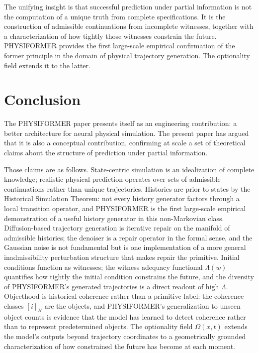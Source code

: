 \documentclass[12pt,oneside]{article}
\theoremstyle{definition}
\begin{document}
The unifying insight is that successful prediction under partial information
is not the computation of a unique truth from complete specifications. It is
the construction of admissible continuations from incomplete witnesses, together
with a characterization of how tightly those witnesses constrain the future.
PHYSIFORMER provides the first large-scale empirical confirmation of the former
principle in the domain of physical trajectory generation. The optionality field
extends it to the latter.

\section*{Conclusion}

The PHYSIFORMER paper presents itself as an engineering contribution: a better
architecture for neural physical simulation. The present paper has argued that
it is also a conceptual contribution, confirming at scale a set of theoretical
claims about the structure of prediction under partial information.

Those claims are as follows. State-centric simulation is an idealization of complete
knowledge; realistic physical prediction operates over sets of admissible continuations
rather than unique trajectories. Histories are prior to states by the Historical
Simulation Theorem: not every history generator factors through a local transition
operator, and PHYSIFORMER is the first large-scale empirical demonstration of a
useful history generator in this non-Markovian class. Diffusion-based trajectory
generation is iterative repair on the manifold of admissible histories; the denoiser
is a repair operator in the formal sense, and the Gaussian noise is not fundamental
but is one implementation of a more general inadmissibility perturbation structure
that makes repair the primitive. Initial conditions function as witnesses; the witness
adequacy functional \(\Lambda(w)\) quantifies how tightly the initial condition
constrains the future, and the diversity of PHYSIFORMER's generated trajectories
is a direct readout of high \(\Lambda\). Objecthood is historical coherence rather
than a primitive label: the coherence classes \([i]_H\) are the objects, and
PHYSIFORMER's generalization to unseen object counts is evidence that the model
has learned to detect coherence rather than to represent predetermined objects.
The optionality field \(\Omega(x, t)\) extends the model's outputs beyond
trajectory coordinates to a geometrically grounded characterization of how
constrained the future has become at each moment.
\end{document}
